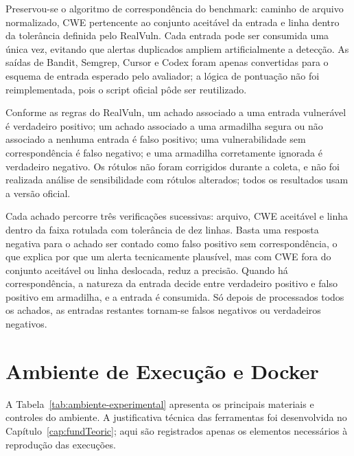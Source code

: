 Preservou-se o algoritmo de correspondência do benchmark: caminho de arquivo normalizado, CWE pertencente ao conjunto aceitável da entrada e linha dentro da tolerância definida pelo RealVuln. Cada entrada pode ser consumida uma única vez, evitando que alertas duplicados ampliem artificialmente a detecção. As saídas de Bandit, Semgrep, Cursor e Codex foram apenas convertidas para o esquema de entrada esperado pelo avaliador; a lógica de pontuação não foi reimplementada, pois o script oficial pôde ser reutilizado.

Conforme as regras do RealVuln, um achado associado a uma entrada vulnerável é verdadeiro positivo; um achado associado a uma armadilha segura ou não associado a nenhuma entrada é falso positivo; uma vulnerabilidade sem correspondência é falso negativo; e uma armadilha corretamente ignorada é verdadeiro negativo. Os rótulos não foram corrigidos durante a coleta, e não foi realizada análise de sensibilidade com rótulos alterados; todos os resultados usam a versão oficial.

Cada achado percorre três verificações sucessivas: arquivo, CWE aceitável e linha dentro da faixa rotulada com tolerância de dez linhas. Basta uma resposta negativa para o achado ser contado como falso positivo sem correspondência, o que explica por que um alerta tecnicamente plausível, mas com CWE fora do conjunto aceitável ou linha deslocada, reduz a precisão. Quando há correspondência, a natureza da entrada decide entre verdadeiro positivo e falso positivo em armadilha, e a entrada é consumida. Só depois de processados todos os achados, as entradas restantes tornam-se falsos negativos ou verdadeiros negativos.

\section{Ambiente de Execução e Docker}\label{sec:materiais-ambiente}

A Tabela~\ref{tab:ambiente-experimental} apresenta os principais materiais e controles do ambiente. A justificativa técnica das ferramentas foi desenvolvida no Capítulo~\ref{cap:fundTeoric}; aqui são registrados apenas os elementos necessários à reprodução das execuções.


